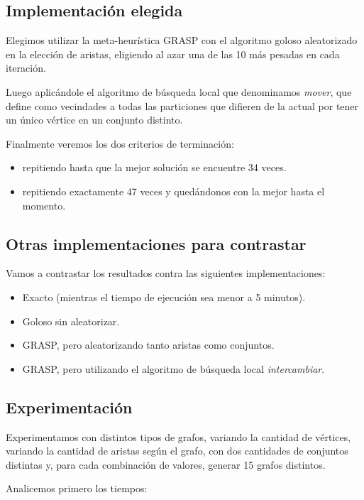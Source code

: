 \subsection{Implementación elegida}

Elegimos utilizar la meta-heurística GRASP con el algoritmo goloso aleatorizado
en la elección de aristas, eligiendo al azar una de las 10 más pesadas en cada
iteración.

Luego aplicándole el algoritmo de búsqueda local que denominamos \textit{mover}, que
define como vecindades a todas las particiones que difieren de la actual por
tener un único vértice en un conjunto distinto.

Finalmente veremos los dos criterios de terminación:
\begin{itemize}
  \item repitiendo hasta que la mejor solución se encuentre 34 veces.
  \item repitiendo exactamente 47 veces y quedándonos con la mejor hasta el momento.
\end{itemize}

\subsection{Otras implementaciones para contrastar}

Vamos a contrastar los resultados contra las siguientes implementaciones:

\begin{itemize}
  \item Exacto (mientras el tiempo de ejecución sea menor a 5 minutos).
  \item Goloso sin aleatorizar.
  \item GRASP, pero aleatorizando tanto aristas como conjuntos.
  \item GRASP, pero utilizando el algoritmo de búsqueda local
  \textit{intercambiar}.
\end{itemize}

\subsection{Experimentación}

Experimentamos con distintos tipos de grafos, variando la cantidad de vértices,
variando la cantidad de aristas según el grafo, con dos cantidades de conjuntos
distintas y, para cada combinación de valores, generar 15 grafos distintos.

Analicemos primero los tiempos:

